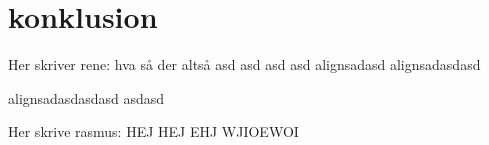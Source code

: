 \section{konklusion}
Her skriver rene:
hva så der altså asd
asd asd asd alignsadasd
alignsadasdasd

alignsadasdasdasd
asdasd

Her skrive rasmus:
HEJ HEJ EHJ WJIOEWOI

